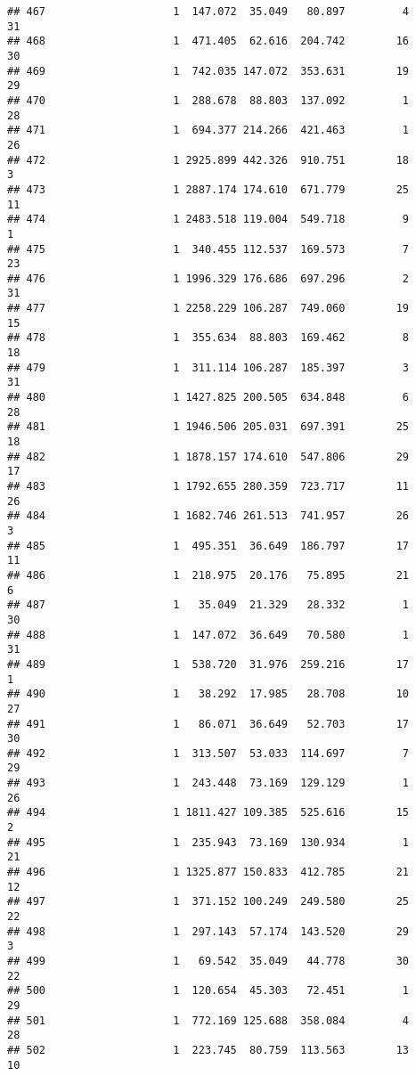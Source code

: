 \documentclass[
]{article}
\begin{document}
\begin{verbatim}
## 467                    1  147.072  35.049   80.897         4        31
## 468                    1  471.405  62.616  204.742        16        30
## 469                    1  742.035 147.072  353.631        19        29
## 470                    1  288.678  88.803  137.092         1        28
## 471                    1  694.377 214.266  421.463         1        26
## 472                    1 2925.899 442.326  910.751        18         3
## 473                    1 2887.174 174.610  671.779        25        11
## 474                    1 2483.518 119.004  549.718         9         1
## 475                    1  340.455 112.537  169.573         7        23
## 476                    1 1996.329 176.686  697.296         2        31
## 477                    1 2258.229 106.287  749.060        19        15
## 478                    1  355.634  88.803  169.462         8        18
## 479                    1  311.114 106.287  185.397         3        31
## 480                    1 1427.825 200.505  634.848         6        28
## 481                    1 1946.506 205.031  697.391        25        18
## 482                    1 1878.157 174.610  547.806        29        17
## 483                    1 1792.655 280.359  723.717        11        26
## 484                    1 1682.746 261.513  741.957        26         3
## 485                    1  495.351  36.649  186.797        17        11
## 486                    1  218.975  20.176   75.895        21         6
## 487                    1   35.049  21.329   28.332         1        30
## 488                    1  147.072  36.649   70.580         1        31
## 489                    1  538.720  31.976  259.216        17         1
## 490                    1   38.292  17.985   28.708        10        27
## 491                    1   86.071  36.649   52.703        17        30
## 492                    1  313.507  53.033  114.697         7        29
## 493                    1  243.448  73.169  129.129         1        26
## 494                    1 1811.427 109.385  525.616        15         2
## 495                    1  235.943  73.169  130.934         1        21
## 496                    1 1325.877 150.833  412.785        21        12
## 497                    1  371.152 100.249  249.580        25        22
## 498                    1  297.143  57.174  143.520        29         3
## 499                    1   69.542  35.049   44.778        30        22
## 500                    1  120.654  45.303   72.451         1        29
## 501                    1  772.169 125.688  358.084         4        28
## 502                    1  223.745  80.759  113.563        13        10

\end{verbatim}
\end{document}
